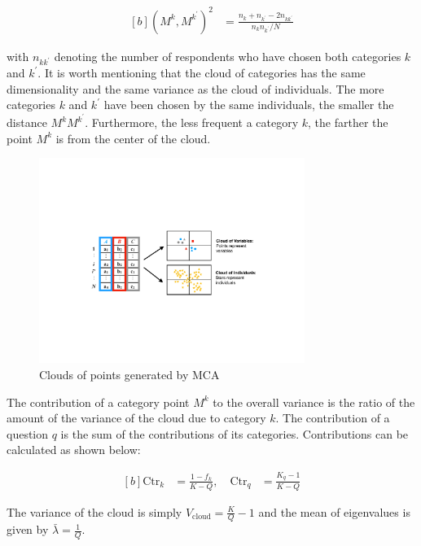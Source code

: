 \documentclass[conference]{IEEEtran}
\begin{document}
\begin{equation}
\begin{aligned}[b]
\label{eq:distCat}
(M^k, M^{k^{\prime}})^2 &= \frac{n_k + n_{k^\prime} - 2 n_{kk^\prime} }{n_k n_{k^\prime}/N}
\end{aligned}
\end{equation}

with \(n_{kk^\prime}\) denoting the number of respondents who have
chosen both categories \(k\) and \(k^\prime.\) It is worth mentioning
that the cloud of categories has the same dimensionality and the same
variance as the cloud of individuals. The more categories \(k\) and
\(k^\prime\) have been chosen by the same individuals, the smaller the
distance \(M^kM^{k^\prime}\). Furthermore, the less frequent a category
\(k\), the farther the point \(M^k\) is from the center of the cloud.

\begin{figure}[!t] 
\centering 
\includegraphics[width=3.4in]{../figs/mcaIdeaNew.pdf}
\caption{Clouds of points generated by MCA}
\label{fig:fig_MCAillustration} 
\end{figure}

The contribution of a category point \(M^k\) to the overall variance is
the ratio of the amount of the variance of the cloud due to category
\(k\). The contribution of a question \(q\) is the sum of the
contributions of its categories. Contributions can be calculated as
shown below:

\begin{equation}
\begin{aligned}[b]
\label{eq:contribMk}
\text{Ctr}_k &= \frac{1-f_k}{K-Q}, \quad \text{Ctr}_q &= \frac{K_q -1 }{K-Q}
\end{aligned}
\end{equation}

The variance of the cloud is simply
\(V_{\text{cloud}} = \frac{K}{Q} - 1\) and the mean of eigenvalues is
given by \(\bar{\lambda} = \frac{1}{Q}.\)
\end{document}

